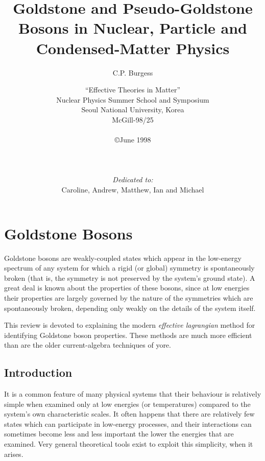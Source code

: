 \documentclass[12pt]{report}
\begin{document}
%
%
\title{Goldstone and Pseudo-Goldstone Bosons in Nuclear,
Particle and Condensed-Matter Physics }
\author{C.P. Burgess}
\date{``Effective Theories in Matter''\\
Nuclear Physics Summer School and Symposium\\
Seoul National University, Korea \\
McGill-98/25\\
$ $ \\
\copyright June 1998\\ 
$ $  \\
$ $  \\
$ $  \\
{\sl Dedicated to:} \\
Caroline, Andrew, Matthew, Ian and Michael}
\maketitle
{}
\tableofcontents
\listoffigures
\listoftables





\chapter{Goldstone Bosons}

Goldstone bosons are  weakly-coupled states which appear in
the low-energy spectrum of any system for which a rigid (or
global) symmetry is spontaneously broken (that is, the
symmetry is not preserved by the system's ground state).  A
great deal is known about the properties of these bosons,
since at low energies their properties are largely governed
by the nature of the symmetries which are spontaneously
broken, depending only weakly on the details of the system
itself.

This review is devoted to explaining the modern {\it
effective lagrangian} method for identifying Goldstone
boson properties. These methods are much more efficient
than are the older current-algebra techniques of yore. 

\section{Introduction}

It is a common feature of many physical systems that their
behaviour is relatively simple when examined only at low
energies (or temperatures) compared to the system's own
characteristic scales. It often happens that there are
relatively few states which can participate in low-energy
processes, and their interactions can sometimes become less
and less important the lower the energies that are examined.
Very general theoretical tools exist to exploit this
simplicity, when it arises.
\end{document}
